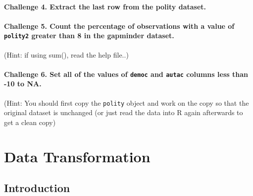 \documentclass[]{book}
\begin{document}
\subsubsection*{Challenge 4. Extract the last row from the polity
dataset.}\label{challenge-4.-extract-the-last-row-from-the-polity-dataset.}

\subsubsection*{\texorpdfstring{Challenge 5. Count the percentage of
observations with a value of \texttt{polity2} greater than 8 in the
gapminder
dataset.}{Challenge 5. Count the percentage of observations with a value of polity2 greater than 8 in the gapminder dataset.}}\label{challenge-5.-count-the-percentage-of-observations-with-a-value-of-polity2-greater-than-8-in-the-gapminder-dataset.}

(Hint: if using sum(), read the help file..)

\subsubsection*{\texorpdfstring{Challenge 6. Set all of the values of
\texttt{democ} and \texttt{autac} columns less than -10 to
NA.}{Challenge 6. Set all of the values of democ and autac columns less than -10 to NA.}}\label{challenge-6.-set-all-of-the-values-of-democ-and-autac-columns-less-than--10-to-na.}

(Hint: You should first copy the \texttt{polity} object and work on the
copy so that the original dataset is unchanged (or just read the data
into R again afterwards to get a clean copy)

\chapter{Data Transformation}\label{data-transformation}

\section{Introduction}\label{introduction-1}
\end{document}
